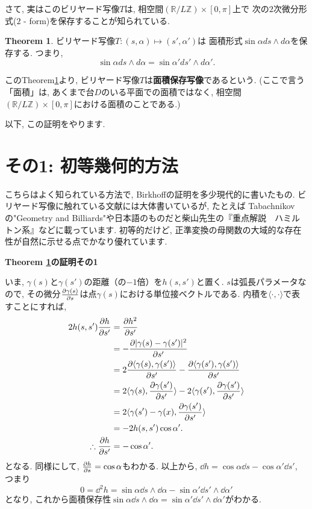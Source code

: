 \documentclass[a4paper]{ujarticle}
\makeatletter
\numberwithin{equation}{section}
\theoremstyle{definition}
\newtheorem{theorem}{Theorem}
\renewenvironment{proof}[1][Proof]{\par
  \pushQED{\qed}%
  \normalfont \topsep6\p@\@plus6\p@\relax
  \trivlist
  \item\relax
  {\bfseries
  #1\@addpunct{.}}\hspace\labelsep\ignorespaces
}{%
  \popQED\endtrivlist\@endpefalse
}
\makeatother
\begin{document}
    さて, 実はこのビリヤード写像$T$は, 相空間$(\mathbb{R}/L \mathbb{Z}) \times [0, \pi]$上で
    次の$2$次微分形式($2$ - form)を保存することが知られている.

    \begin{theorem} \label{th:area}
        ビリヤード写像$T: (s, \alpha) \mapsto (s', \alpha')$は
        面積形式$\sin{\alpha} d s \wedge d \alpha$を保存する. 
        つまり, 
        \[
            \sin{\alpha} d s \wedge d \alpha = \sin{\alpha'} d s' \wedge d \alpha'.
        \]
    \end{theorem}

    このTheorem\ref{th:area}より, ビリヤード写像$T$は\textbf{面積保存写像}であるという.
    (ここで言う「面積」は, あくまで台$D$のいる平面での面積ではなく,
    相空間$(\mathbb{R}/L \mathbb{Z}) \times [0, \pi]$における面積のことである.)

    以下, この証明をやります.
\section{その1: 初等幾何的方法}
    こちらはよく知られている方法で, Birkhoffの証明を多少現代的に書いたもの.
    ビリヤード写像に触れている文献には大体書いているが,
    たとえば Tabachnikovの"Geometry and Billiards"や日本語のものだと柴山先生の『重点解説　ハミルトン系』などに載っています.
    初等的だけど, 正準変換の母関数の大域的な存在性が自然に示せる点でかなり優れています.

    \begin{proof}[Theorem \ref{th:area}の証明その1]
        いま, $\gamma(s)$と$\gamma(s')$の距離（の$-1$倍）を$h(s, s')$と置く.
        $s$は弧長パラメータなので, 
        その微分$\pdv{\gamma(s)}{s}$は点$\gamma(s)$における単位接ベクトルである.
        内積を$\langle \cdot, \cdot \rangle$で表すことにすれば,
		\begin{align*}
			2 h(s, s') \pdv{h}{s'} &= \pdv{h^2}{s'}\\
            &= - \pdv{|\gamma(s) - \gamma(s')|^2}{s'}\\
            &= 2 \pdv{\langle \gamma(s) , \gamma(s') \rangle}{s'} - \pdv{\langle \gamma(s') , \gamma(s') \rangle}{s'} \\
			&= 2 \langle \gamma(s) , \pdv{\gamma(s')}{s'} \rangle - 2 \langle \gamma(s') , \pdv{\gamma(s')}{s'} \rangle \\
            &= 2\langle \gamma(s') - \gamma(x) , \pdv{\gamma(s')}{s'} \rangle \\
			&= - 2h(s, s') \cos \alpha'. \\
            \therefore \pdv{h}{s'} &= - \cos \alpha'.
        \end{align*}
        となる.
		同様にして, $\pdv{h}{s} = \cos \alpha$もわかる. 
        以上から, $\dd h = \cos \alpha \dd s - \cos \alpha' \dd s'$, 
        つまり 
        \[
            0 = \dd^2 h = \sin \alpha \dd s \land \dd \alpha - \sin \alpha' \dd s' \land \dd \alpha'
        \]
        となり,
        これから面積保存性$\sin \alpha \dd s \land \dd \alpha = \sin \alpha' \dd s' \land \dd \alpha'$がわかる.
    \end{proof}
\end{document}
